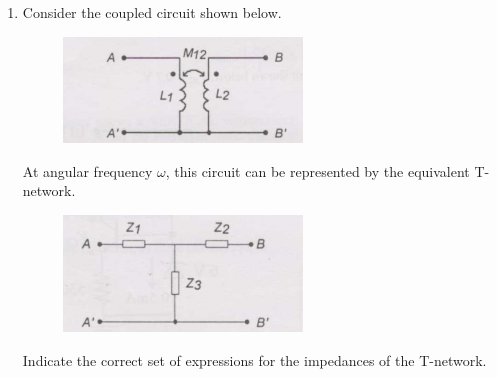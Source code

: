 \documentclass[journal]{IEEEtran}
\begin{document}
\begin{enumerate}
\begin{multicols}{4}
\begin{enumerate}
\item $1\ \mathrm{A}$ and $1\ \mathrm{A}$  
\end{enumerate}
\end{multicols}
\hfill(GATE IN 2007)
\item Consider the coupled circuit shown below.
\begin{figure}[H]
    \centering
      \includegraphics[width=0.6\textwidth]{22.jpg} 
      \caption{}
    \label{fig:fig22} 
\end{figure}
At angular frequency $\omega$, this circuit can be represented by the equivalent T-network.  
\begin{figure}[H]
    \centering
      \includegraphics[width=0.6\textwidth]{23.jpg} 
      \caption{}
    \label{fig:fig23} 
\end{figure}
Indicate the correct set of expressions for the impedances of the T-network.


\end{enumerate}
\end{document}

